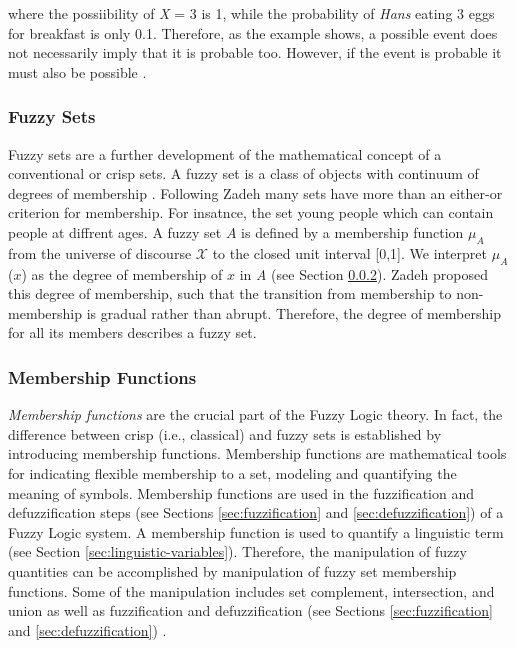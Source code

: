 \documentclass[11pt]{article}
\begin{document}
where the possiibility of \textit{X} = 3 is 1, while the probability of
\textit{Hans} eating 3 eggs for breakfast is only 0.1. Therefore, as the example
shows, a possible event does not necessarily imply that it is probable too.
However, if the event is probable it must also be possible
\cite{zimmermann:fuzzy-sets}.

\subsubsection{Fuzzy Sets}

Fuzzy sets are a further development of the mathematical concept of a
conventional or crisp sets. A fuzzy set is a class of objects with continuum of
degrees of membership \cite{zadeh:fuzzy}. Following Zadeh \cite{zadeh:fuzzy}
many sets have more than an either-or criterion for membership. For insatnce,
the set young people which can contain people at diffrent ages. A fuzzy set
$\textit{A}$ is defined by a membership function $\mu_A$ from the universe of
discourse $\mathcal{X}$ to the closed unit interval [0,1]. We interpret
$\mu_A$($\textit{x}$) as the degree of membership of $\textit{x}$ in \textit{A}
(see Section \ref{sec:membership-function}). Zadeh proposed this degree of
membership, such that the transition from membership to non-membership is
gradual rather than abrupt. Therefore, the degree of membership for all its
members describes a fuzzy set.

\subsubsection{Membership Functions}
\label{sec:membership-function}

\textit{Membership functions} are the crucial part of the Fuzzy Logic theory. In
fact, the difference between crisp (i.e., classical) and fuzzy sets is
established by introducing membership functions. Membership functions are
mathematical tools for indicating flexible membership to a set, modeling and
quantifying the meaning of symbols. Membership functions are used in the
fuzzification and defuzzification steps (see Sections \ref{sec:fuzzification}
and \ref{sec:defuzzification}) of a Fuzzy Logic system. A membership function is
used to quantify a linguistic term (see Section \ref{sec:linguistic-variables}).
Therefore, the manipulation of fuzzy quantities can be accomplished by
manipulation of fuzzy set membership functions. Some of the manipulation
includes set complement, intersection, and union as well as fuzzification and
defuzzification (see Sections \ref{sec:fuzzification} and
\ref{sec:defuzzification}) \cite{schalkoff:intelligent-systems}.
\end{document}
